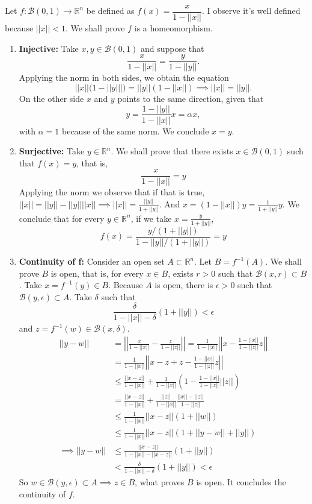 \documentclass[a4paper,11pt]{article}
\theoremstyle{mytheor}
\theoremstyle{mytheor}
\theoremstyle{remark}
\newcommand{\B}{\mathcal{B}}
\newcommand{\R}{\mathbb{R}}
\begin{document}
Let $f: \B(0,1) \to \R^n$ be defined as $f(x) = \dfrac{x}{1 - ||x||}$. I
observe it's well defined because $||x|| < 1$. We shall prove $f$ is a
homeomorphism. 
\begin{enumerate}
    \item \textbf{Injective:} Take $x, y \in \B(0,1)$ and suppose that  
    $$
    \frac{x}{1 - ||x||} = \frac{y}{1 - ||y||}. 
    $$
    Applying the norm in both sides, we obtain the equation 
    $$||x||(1 - ||y|||) = ||y||(1 - ||x||) \implies ||x|| = ||y||.$$
    On the other side $x$ and $y$ points to the same direction, given that 
    $$
    y = \frac{1 - ||y||}{1 - ||x||}x = \alpha x, 
    $$
    with $\alpha = 1$ because of the same norm. We conclude $x = y$. 

    \item \textbf{Surjective:} Take $y \in \R^n$. We shall prove that there
    exists $x \in \B(0,1)$ such that $f(x) = y$, that is, 
    $$
    \frac{x}{1 - ||x||} = y
    $$
    Applying the norm we observe that if that is true, $||x|| = ||y|| -
    ||y||||x|| \implies ||x|| = \frac{||y||}{1 + ||y||}$. And $x = (1 -
    ||x||)y = \frac{1}{1 + ||y||}y$. We conclude that for every $y \in \R^n$,
    if we take $x = \frac{y}{1 + ||y||}$,
    $$
    f(x) = \frac{y/(1 + ||y||)}{1 - ||y||/(1 + ||y||)} = y
    $$

    \item \textbf{Continuity of f:} Consider an open set $A \subset \R^n$. Let
    $B = f^{-1}(A)$. We shall prove $B$ is open, that is, for every $x \in B$,
    exists $r > 0$ such that $\B(x, r) \subset B$. Take $x = f^{-1}(y) \in B$.
    Because $A$ is open, there is $\epsilon > 0$ such that $\B(y, \epsilon)
    \subset A$. Take $\delta$ such that 
    $$
    \frac{\delta}{1 - ||x|| - \delta}(1 + ||y||) < \epsilon
    $$
    and $z = f^{-1}(w) \in \B(x,\delta)$. 
    \begin{equation*}
        \begin{split}
            ||y - w|| &= \left|\left|\frac{x}{1 - ||x||} - \frac{z}{1 - ||z||}\right|\right| = \frac{1}{1 - ||x||}\left|\left|x - \frac{1 - ||x||}{1 - ||z||}z\right|\right| \\ 
            &= \frac{1}{1 - ||x||}\left|\left|x - z + z - \frac{1 - ||x||}{1 - ||z||}z\right|\right| \\
            &\le \frac{||x-z||}{1 - ||x||} + \frac{1}{1 - ||x||}\left(1 - \frac{1 - ||x||}{1 - ||z||}||z||\right) \\
            &= \frac{||x-z||}{1 - ||x||} + \frac{||z||}{1 - ||x||}\frac{||x|| - ||z||}{1 - ||z||} \\
            &\le \frac{1}{1 - ||x||}||x-z||(1 + ||w||) \\
            &\le \frac{1}{1 - ||x||}||x-z||(1 + ||y - w|| + ||y||) \\
            \implies ||y - w|| &\le \frac{||x-z||}{1 - ||x|| - ||x-z||}(1 + ||y||) \\ 
            &< \frac{\delta}{1 - ||x|| - \delta}(1 + ||y||) < \epsilon
        \end{split}
    \end{equation*}
    So $w \in \B(y, \epsilon) \subset A \implies z \in B$, what proves $B$ is
    open. It concludes the continuity of $f$. 


\end{enumerate}
\end{document}
